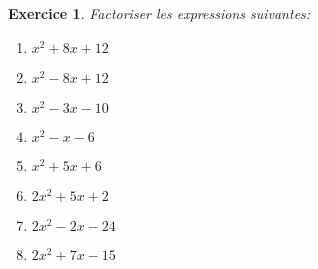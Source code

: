 \documentclass[12pt]{article}
\newtheorem{exercice}{\bf Exercice}
\newenvironment{exo}{
\begin{exercice}\smallskip\normalfont}{\end{exercice}
}
\begin{document}

\begin{exo} Factoriser les expressions suivantes:
\begin{multicols}{4}
\begin{enumerate}
\item $x^2 + 8x + 12$
\item $x^2 - 8x + 12$
\item $x^2-3x-10$
\item $x^2-x-6$
\item $x^2+5x+6$
\item $2x^2+5x+2$
\item $2x^2-2x-24$
\item $2x^2+7x-15$
\end{enumerate}
\end{multicols}
\end{exo}
\end{document}

